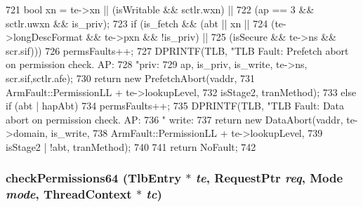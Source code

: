 \begin{DoxyCode}
{721     bool xn     = te->xn || (isWritable && sctlr.wxn) ||
722                             (ap == 3    && sctlr.uwxn && is_priv);
723     if (is_fetch && (abt || xn ||
724                      (te->longDescFormat && te->pxn && !is_priv) ||
725                      (isSecure && te->ns && scr.sif))) {
726         permsFaults++;
727         DPRINTF(TLB, "TLB Fault: Prefetch abort on permission check. AP:%
728                      "priv:%
729                      ap, is_priv, is_write, te->ns, scr.sif,sctlr.afe);
730         return new PrefetchAbort(vaddr,
731                                  ArmFault::PermissionLL + te->lookupLevel,
732                                  isStage2, tranMethod);
733     } else if (abt | hapAbt) {
734         permsFaults++;
735         DPRINTF(TLB, "TLB Fault: Data abort on permission check. AP:%
736                " write:%
737         return new DataAbort(vaddr, te->domain, is_write,
738                              ArmFault::PermissionLL + te->lookupLevel,
739                              isStage2 | !abt, tranMethod);
740     }
741     return NoFault;
742 }
\end{DoxyCode}
\hypertarget{classArmISA_1_1TLB_a1ba70376d3c5636e94c5fd6312f7b63e}{
\subsubsection[{checkPermissions64}]{ checkPermissions64 ({\bf TlbEntry} $\ast$ {\em te}, \/  {\bf RequestPtr} {\em req}, \/  {\bf Mode} {\em mode}, \/  {\bf ThreadContext} $\ast$ {\em tc})}}
\label{classArmISA_1_1TLB_a1ba70376d3c5636e94c5fd6312f7b63e}



